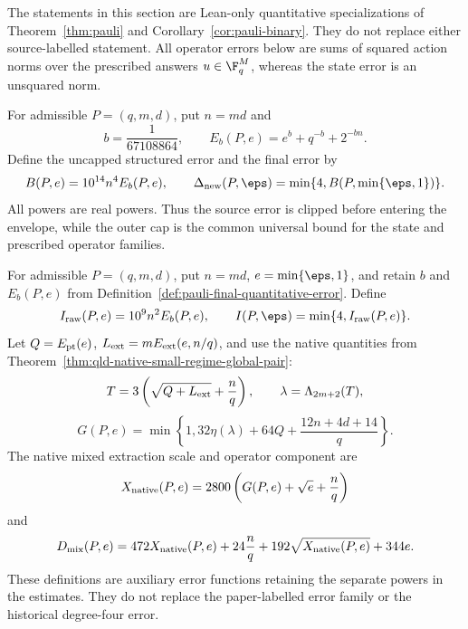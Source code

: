 The statements in this section are Lean-only quantitative specializations of
Theorem~\ref{thm:pauli} and Corollary~\ref{cor:pauli-binary}.  They do not
replace either source-labelled statement.  All operator errors below are sums
of squared action norms over the prescribed answers $u\in\F_q^M$, whereas the
state error is an unsquared norm.

\begin{definition}
\label{def:pauli-final-quantitative-error}
\leanok
{}
For admissible $P=(q,m,d)$, put $n=md$ and
\[
 b=\frac1{67108864},\qquad
 E_b(P,e)=e^b+q^{-b}+2^{-bn}.
\]
Define the uncapped structured error and the final error by
\[
 B(P,e)=10^{14}n^4E_b(P,e),\qquad
 \Delta_{\mathrm{new}}(P,\eps)
   =\min\{4,B(P,\min\{\eps,1\})\}.
\]
All powers are real powers.  Thus the source error is clipped before entering
the envelope, while the outer cap is the common universal bound for the state
and prescribed operator families.
\end{definition}

\begin{definition}
\label{def:pauli-final-degree-two-error}
\leanok
{}
For admissible $P=(q,m,d)$, put $n=md$, $e=\min\{\eps,1\}$, and retain
$b$ and $E_b(P,e)$ from Definition~\ref{def:pauli-final-quantitative-error}.
Define
\[
 I_{\rm raw}(P,e)=10^9n^2E_b(P,e),\qquad
 I(P,\eps)=\min\{4,I_{\rm raw}(P,e)\}.
\]
Let $Q=E_{\rm pt}(e)$, $L_{\rm ext}=mE_{\rm ext}(e,n/q)$, and use the native
quantities from Theorem~\ref{thm:qld-native-small-regime-global-pair}:
\[
 T=3\left(\sqrt{Q+L_{\rm ext}}+\frac nq\right),\qquad
 \lambda=\Lambda_{2m+2}(T),
\]
\[
 G(P,e)=\min\left\{1,
 32\eta(\lambda)+64Q+\frac{12n+4d+14}{q}\right\}.
\]
The native mixed extraction scale and operator component are
\[
 X_{\rm native}(P,e)=2800\left(G(P,e)+\sqrt e+\frac nq\right)
\]
and
\[
 D_{\rm mix}(P,e)=472X_{\rm native}(P,e)+24\frac nq
   +192\sqrt{X_{\rm native}(P,e)}+344e.
\]
These definitions are auxiliary error functions retaining the separate powers
in the estimates.  They do not replace the paper-labelled error family or the
historical degree-four error.
\end{definition}

